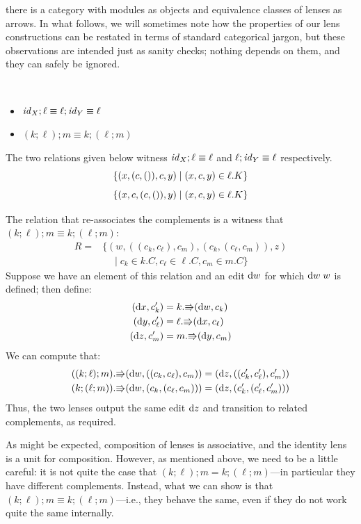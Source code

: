 there is a category with modules as objects and equivalence classes of
lenses as arrows.  In what follows,
we will sometimes note how the properties of our lens
constructions can be restated in terms of standard categorical jargon, but
these observations are intended just as sanity checks; nothing depends on
them, and they can safely be ignored.
\begin{theorem}\ 
    \begin{itemize}
        \item $\mathit{id}_X;\ell \equiv \ell;\mathit{id}_Y \equiv \ell$
        \item $(k;\ell);m \equiv k;(\ell;m)$
    \end{itemize}
\end{theorem}
\begin{pf}
    The two relations given below witness $\mathit{id}_X;\ell \equiv \ell$ and
    $\ell;\mathit{id}_Y \equiv \ell$ respectively.
    \[\{(x,(c,{()}),c,y) \mid (x,c,y) \in \ell.K\}\]
    \[\{(x,c,(c,{()}),y) \mid (x,c,y) \in \ell.K\}\]

    The relation that re-associates the complements is a witness that
    $(k;\ell);m \equiv k;(\ell;m)$:
    \begin{align*}
        R ={}& \{(w,((c_k,c_\ell),c_m),(c_k,(c_\ell,c_m)),z) \\
            & \quad\mid c_k \in k.C, c_\ell \in \ell.C, c_m \in m.C\}
    \end{align*}
    Suppose we have an element of this relation and an edit $\textrm{d} w$ for which
    $\textrm{d} w \; w$ is defined; then define:
    \begin{align*}
        (\textrm{d} x, c_k') &= k.\mathord{\Rrightarrow}(\textrm{d} w, c_k) \\
        (\textrm{d} y, c_\ell') &= \ell.\mathord{\Rrightarrow}(\textrm{d} x, c_\ell) \\
        (\textrm{d} z, c_m') &= m.\mathord{\Rrightarrow}(\textrm{d} y, c_m)
    \end{align*}
    We can compute that:
    \begin{align*}
        ((k;\ell);m).\mathord{\Rrightarrow}(\textrm{d} w,((c_k,c_\ell),c_m)) &= (\textrm{d} z, ((c_k',c_\ell'),c_m')) \\
        (k;(\ell;m)).\mathord{\Rrightarrow}(\textrm{d} w,(c_k,(c_\ell,c_m))) &= (\textrm{d} z, (c_k',(c_\ell',c_m')))
    \end{align*}
    Thus, the two lenses output the same edit $\textrm{d} z$ and transition to
    related complements, as required.
\end{pf}
\else
As might be expected, composition of lenses is associative, and
the identity lens is a unit for composition.  However, as mentioned above,
we need to be a 
little careful: it is not quite the case that $(k;\ell);m = k;(\ell;m)$---in
particular they have different complements.  Instead, what we can show is
that $(k;\ell);m \equiv k;(\ell;m)$\iffull---i.e., they behave the same, even if
they do not work quite the same internally\fi.  
\fi

